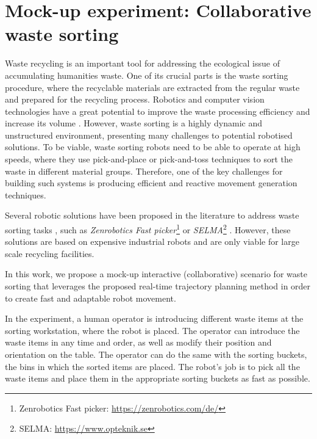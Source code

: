 


\section{Mock-up experiment: Collaborative waste sorting}
\label{ch:experiment_mockup}

Waste recycling is an important tool for addressing the ecological issue of accumulating humanities waste. One of its  crucial parts is the waste sorting procedure, where the recyclable materials are extracted from the regular waste and prepared for the recycling process. Robotics and computer vision technologies have a great potential to improve the waste processing efficiency and increase its volume \cite{Koskinopoulou2021}. 
However, waste sorting is a highly dynamic and unstructured environment, presenting many challenges to potential robotised solutions. To be viable, waste sorting robots need to be able to operate at high speeds, where they use pick-and-place or pick-and-toss \cite{Hassan2022} techniques to sort the waste in different material groups. Therefore, one of the key challenges for building such systems is producing efficient and reactive movement generation techniques. 

Several robotic solutions have been proposed in the literature to address waste sorting tasks \cite{SARC2019}, such as \textit{Zenrobotics Fast picker}\footnote{Zenrobotics Fast picker: \url{https://zenrobotics.com/de/}} or \textit{SELMA}\footnote{SELMA: \url{https://www.opteknik.se}} . However, these solutions are based on expensive industrial robots and are only viable for large scale recycling facilities.

In this work, we propose a mock-up interactive (collaborative) scenario for waste sorting that leverages the proposed real-time trajectory planning method in order to create fast and adaptable robot movement. 

In the experiment, a human operator is introducing different waste items at the sorting workstation, where the robot is placed. The operator can introduce the waste items in any time and order, as well as modify their position and orientation on the table. The operator can do the same with the sorting buckets, the bins in which the sorted items are placed. The robot's job is to pick all the waste items and place them in the appropriate sorting buckets as fast as possible.

